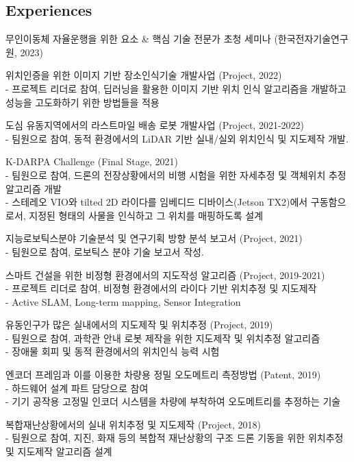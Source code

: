\documentclass[margin]{res}
\begin{document}
\begin{resume}
		\section{Experiences}
		\par	무인이동체 자율운행을 위한 요소 \& 핵심 기술 전문가 초청 세미나 (한국전자기술연구원, 2023)
		\par	위치인증을 위한 이미지 기반 장소인식기술 개발사업 (Project, 2022) 
		\\- 프로젝트 리더로 참여, 딥러닝을 활용한 이미지 기반 위치 인식 알고리즘을 개발하고 성능을 고도화하기 위한 방법들을 적용
		\par	도심 유동지역에서의 라스트마일 배송 로봇 개발사업 (Project, 2021-2022) 
		\\- 팀원으로 참여, 동적 환경에서의 LiDAR 기반 실내/실외 위치인식 및 지도제작 개발.
		\par	K-DARPA Challenge (Final Stage, 2021)
		\\-	팀원으로 참여, 드론의 전장상황에서의 비행 시험을 위한 자세추정 및 객체위치 추정 알고리즘 개발
		\\-	스테레오 VIO와 tilted 2D 라이다를 임베디드 디바이스(Jetson TX2)에서 구동함으로서, 지정된 형태의 사물을 인식하고 그 위치를 매핑하도록 설계
		\par	지능로보틱스분야 기술분석 및 연구기획 방향 분석 보고서 (Project, 2021)
		\\-	팀원으로 참여, 로보틱스 분야 기술 보고서 작성.
		\par	스마트 건설을 위한 비정형 환경에서의 지도작성 알고리즘 (Project, 2019-2021)
		\\- 프로젝트 리더로 참여, 비정형 환경에서의 라이다 기반 위치추정 및 지도제작
		\\-	Active SLAM, Long-term mapping, Sensor Integration
		\par	유동인구가 많은 실내에서의 지도제작 및 위치추정 (Project, 2019)
		\\-	팀원으로 참여, 과학관 안내 로봇 제작을 위한 지도제작 및 위치추정 알고리즘
		\\-	장애물 회피 및 동적 환경에서의 위치인식 능력 시험
		\par	엔코더 프레임과 이를 이용한 차량용 정밀 오도메트리 측정방법 (Patent, 2019)
		\\-	하드웨어 설계 파트 담당으로 참여
		\\- 기기 공작용 고정밀 인코더 시스템을 차량에 부착하여 오도메트리를 추정하는 기술
		\par	복합재난상황에서의 실내 위치추정 및 지도제작 (Project, 2018)
		\\-	팀원으로 참여, 지진, 화재 등의 복합적 재난상황의 구조 드론 기동을 위한 위치추정 및 지도제작 알고리즘 설계

\end{resume}
\end{document}
